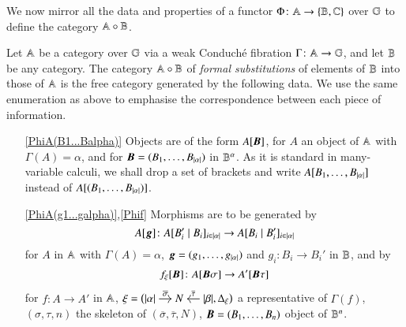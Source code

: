 We now mirror all the data and properties of a functor $\Phi \colon \mathbb A \to \{ \mathbb B,\mathbb C\}$ over $\mathbb G$ to define the category $\mathbb A \circ \mathbb B$. 

\begin{definition}\label{definition A ring B}
    Let $\mathbb A$ be a category over $\mathbb G$ via a weak Conduché fibration $\Gamma \colon \mathbb A \to \mathbb G$, and let $\mathbb B$ be any category. The category $\mathbb A \circ \mathbb B$ of \emph{formal substitutions} of elements of $\mathbb B$ into those of $\mathbb A$ is the free category generated by the following data. We use the same enumeration as above to emphasise the correspondence between each piece of information.
    \begin{itemize}[wide=0pt,leftmargin=*]
        \item[\ref{PhiA(B1...Balpha)}] Objects are of the form $A[{\boldsymbol B}]$, for $A$ an object of $\mathbb A$ with $\Gamma(A)=\alpha$, and for  ${\boldsymbol B}=(B_1,\dots,B_{\lvert \alpha \rvert})$ in $\mathbb B^\alpha$. As it is standard in many-variable calculi, we shall drop a set of brackets and write $A[B_1,\dots,B_{\lvert \alpha \rvert}]$ instead of $A[(B_1,\dots,B_{\lvert \alpha \rvert})]$.
        \item[\ref{PhiA(g1...galpha)},\ref{Phif}] Morphisms are to be generated by
        \[
        A[{\boldsymbol g}] \colon A [{B_i'} \mid {B_i} ]_{i \in \lvert \alpha \rvert} \to A [{B_i} \mid {B_i'} ]_{i \in \lvert \alpha \rvert}
        \]
       for $A$ in $\mathbb A$ with $\Gamma(A)=\alpha$, ${\boldsymbol g}=(g_1,\dots,g_{\lvert \alpha \rvert})$ and $g_i \colon B_i \to B_i'$ in $\mathbb B$, %
        and by
        \[
        f_{\xi}[{\boldsymbol B}] \colon A[{\boldsymbol B}\sigma] \to A'[{\boldsymbol B}\tau]
        \]
        for $f \colon A \to A'$ in $\mathbb A$, 
        $
        \xi = \bigl(
        \begin{tikzcd}[cramped,sep=small]
        \length\alpha \ar[r,"\overline\sigma"] & N & \length\beta \ar[l,"\overline\tau"']
        \end{tikzcd},\Delta_\xi \bigr)
        $
        a representative of $\Gamma(f)$, $(\sigma,\tau,n)$ the skeleton of $(\overline\sigma,\overline\tau,N)$, ${\boldsymbol B}=(B_1,\dots,B_n)$ object of $\mathbb B^n$. %

\end{itemize}
\end{definition}
